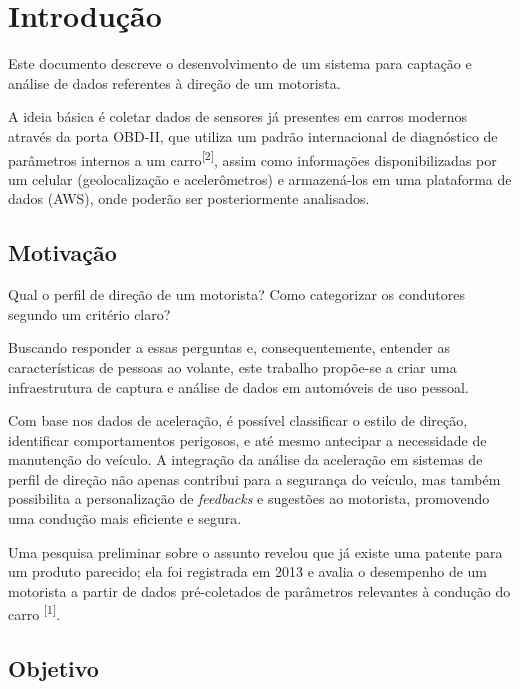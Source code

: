 \chapter{Introdução}\label{CAP:introducao}

Este documento descreve o desenvolvimento de um sistema para captação e análise de dados referentes à direção de um motorista.

A ideia básica é coletar dados de sensores já presentes em carros modernos através da porta OBD-II, que utiliza um padrão internacional de diagnóstico de parâmetros internos a um carro\textsuperscript{[2]}, assim como informações disponibilizadas por um celular (geolocalização e acelerômetros) e armazená-los em uma plataforma de dados (AWS), onde poderão ser posteriormente analisados.

\section{Motivação}

Qual o perfil de direção de um motorista? Como categorizar os condutores segundo um critério claro?

Buscando responder a essas perguntas e, consequentemente, entender as características de pessoas ao volante, este trabalho propõe-se a criar uma infraestrutura de captura e análise de dados em automóveis de uso pessoal.

Com base nos dados de aceleração, é possível classificar o estilo de direção, identificar comportamentos perigosos, e até mesmo antecipar a necessidade de manutenção do veículo. A integração da análise da aceleração em sistemas de perfil de direção não apenas contribui para a segurança do veículo, mas também possibilita a personalização de \textit{feedbacks} e sugestões ao motorista, promovendo uma condução mais eficiente e segura.

	
Uma pesquisa preliminar sobre o assunto revelou que já existe uma patente para um produto parecido; ela foi registrada em 2013 e avalia o desempenho de um motorista a partir de dados pré-coletados de parâmetros relevantes à condução do carro \textsuperscript{[1]}.

\section{Objetivo}

